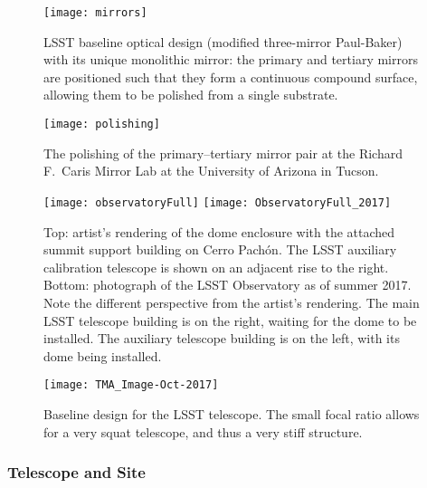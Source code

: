\begin{figure}
\texttt{[image: mirrors]}
\caption{LSST baseline optical design (modified three-mirror
  Paul-Baker) with its unique
monolithic mirror: the primary and tertiary mirrors are positioned such
that they form a continuous compound surface, allowing them to be polished
from a single substrate.}
\label{Fig:optics}
\end{figure}


\begin{figure}
\texttt{[image: polishing]}
\caption{The polishing of the primary--tertiary mirror pair at the Richard F.\ Caris Mirror Lab at the University of Arizona in Tucson. }
\label{Fig:polishing}
\end{figure}


\begin{figure}
\texttt{[image: observatoryFull]}
\texttt{[image: ObservatoryFull\_2017]}
\caption{Top: artist's rendering of the dome enclosure
with the attached summit support building on Cerro Pach\'{o}n. The LSST auxiliary
calibration telescope is shown on an adjacent rise to the right.
Bottom: photograph of the LSST Observatory as of summer 2017. Note the
different perspective from the artist's rendering.  The main LSST
telescope building is on the right, waiting for the dome to be
installed. The auxiliary telescope building is on the left, with its
dome being installed.}
\label{Fig:observatory}
\end{figure}

\begin{figure}
\texttt{[image: TMA\_Image-Oct-2017]}
\caption{Baseline design for the
LSST telescope.  The small focal ratio allows for a very squat
telescope, and thus a very stiff structure.  }
\label{Fig:telescope}
\end{figure}



\subsubsection{ Telescope and Site}

